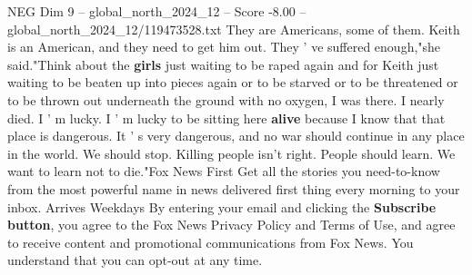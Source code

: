 \begin{textsample}{NEG Dim 9 – global\_north\_2024\_12 – Score -8.00 – global\_north\_2024\_12/119473528.txt}
They are Americans, some of them.
Keith is an American, and they need to get him out.
They ' ve suffered enough,"she said."Think about the \textbf{girls} just waiting to be raped again and for Keith just waiting to be beaten up into pieces again or to be starved or to be threatened or to be thrown out underneath the ground with no oxygen, I was there.
I nearly died.
I ' m lucky.
I ' m lucky to be sitting here \textbf{alive} because I know that that place is dangerous.
It ' s very dangerous, and no war should continue in any place in the world.
We should stop.
Killing people isn't right.
People should learn.
We want to learn not to die."Fox News First Get all the stories you need-to-know from the most powerful name in news delivered first thing every morning to your inbox.
Arrives Weekdays By entering your email and clicking the \textbf{Subscribe} \textbf{button}, you agree to the Fox News Privacy Policy and Terms of Use, and agree to receive content and promotional communications from Fox News.
You understand that you can opt-out at any time.

\end{textsample}
